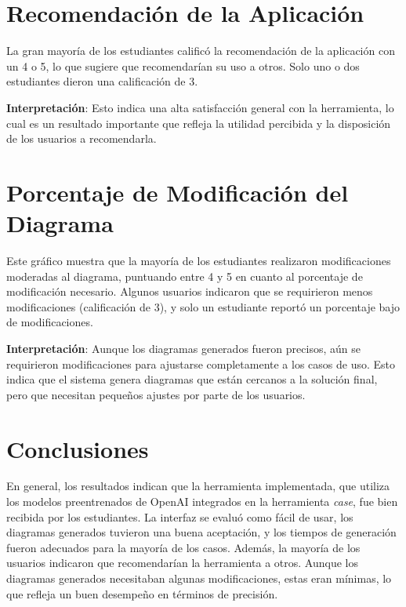 \section{Recomendación de la Aplicación}

La gran mayoría de los estudiantes calificó la recomendación de la aplicación con un 4 o 5, lo que sugiere que recomendarían su uso a otros. Solo uno o dos estudiantes dieron una calificación de 3.

\textbf{Interpretación}: Esto indica una alta satisfacción general con la herramienta, lo cual es un resultado importante que refleja la utilidad percibida y la disposición de los usuarios a recomendarla.

\section{Porcentaje de Modificación del Diagrama}

Este gráfico muestra que la mayoría de los estudiantes realizaron modificaciones moderadas al diagrama, puntuando entre 4 y 5 en cuanto al porcentaje de modificación necesario. Algunos usuarios indicaron que se requirieron menos modificaciones (calificación de 3), y solo un estudiante reportó un porcentaje bajo de modificaciones.

\textbf{Interpretación}: Aunque los diagramas generados fueron precisos, aún se requirieron modificaciones para ajustarse completamente a los casos de uso. Esto indica que el sistema genera diagramas que están cercanos a la solución final, pero que necesitan pequeños ajustes por parte de los usuarios.

\section{Conclusiones}

En general, los resultados indican que la herramienta implementada, que utiliza los modelos preentrenados de OpenAI integrados en la herramienta \textit{case}, fue bien recibida por los estudiantes. La interfaz se evaluó como fácil de usar, los diagramas generados tuvieron una buena aceptación, y los tiempos de generación fueron adecuados para la mayoría de los casos. Además, la mayoría de los usuarios indicaron que recomendarían la herramienta a otros. Aunque los diagramas generados necesitaban algunas modificaciones, estas eran mínimas, lo que refleja un buen desempeño en términos de precisión.
